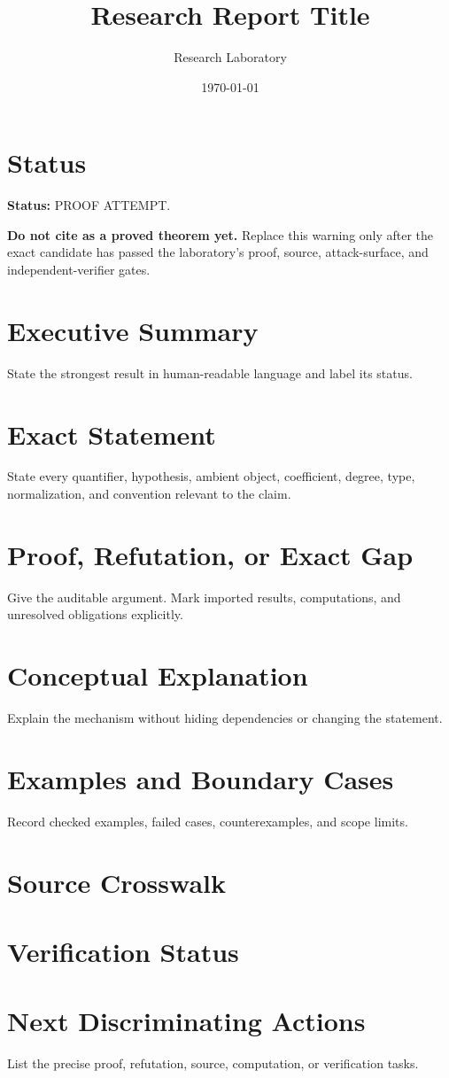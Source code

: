 \documentclass[11pt]{article}
\title{Research Report Title}
\author{Research Laboratory}
\date{\today}
\begin{document}
\maketitle

\section*{Status}

\textbf{Status:} PROOF ATTEMPT.

\textbf{Do not cite as a proved theorem yet.} Replace this warning only after
the exact candidate has passed the laboratory's proof, source, attack-surface,
and independent-verifier gates.

\section{Executive Summary}

State the strongest result in human-readable language and label its status.

\section{Exact Statement}

State every quantifier, hypothesis, ambient object, coefficient, degree, type,
normalization, and convention relevant to the claim.

\section{Proof, Refutation, or Exact Gap}

Give the auditable argument. Mark imported results, computations, and unresolved
obligations explicitly.

\section{Conceptual Explanation}

Explain the mechanism without hiding dependencies or changing the statement.

\section{Examples and Boundary Cases}

Record checked examples, failed cases, counterexamples, and scope limits.

\section{Source Crosswalk}



\section{Verification Status}



\section{Next Discriminating Actions}

List the precise proof, refutation, source, computation, or verification tasks.



\end{document}
